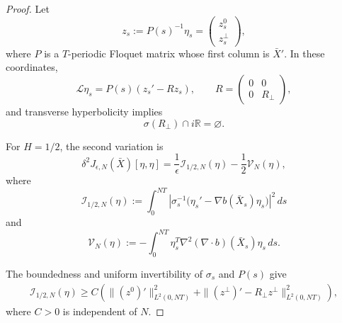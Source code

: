 \documentclass[preprint,12pt]{elsarticle}
\theoremstyle{definition}
\theoremstyle{plain}
\begin{document}
\begin{proof}
Let
\begin{equation*}
    z_s
    :=
    P(s)^{-1}\eta_s
    =
    \begin{pmatrix}
        z_s^0\\
        z_s^\perp
    \end{pmatrix},
\end{equation*}
where $P$ is a $T$-periodic Floquet matrix whose first column is
$\bar X'$. In these coordinates,
\begin{equation*}
    \mathcal L\eta_s
    =
    P(s)(z_s'-Rz_s),
    \qquad
    R=
    \begin{pmatrix}
        0&0\\
        0&R_\perp
    \end{pmatrix},
\end{equation*}
and transverse hyperbolicity implies
\begin{equation*}
    \sigma(R_\perp)\cap i\mathbb R=\varnothing.
\end{equation*}

For $H=1/2$, the second variation is
\begin{equation}
\label{eq:second-variation-H-half}
    \delta^2J_{\epsilon,N}(\bar X)[\eta,\eta]
    =
    \frac1\epsilon\mathcal I_{1/2,N}(\eta)
    -
    \frac12\mathcal V_N(\eta),
\end{equation}
where
\begin{equation}
\label{eq:kinetic-H-half}
    \mathcal I_{1/2,N}(\eta)
    :=
    \int_0^{NT}
    \left|
        \sigma_s^{-1}
        \bigl(
            \eta_s'-\nabla b(\bar X_s)\eta_s
        \bigr)
    \right|^2\,ds
\end{equation}
and
\begin{equation}
\label{eq:potential-H-half}
    \mathcal V_N(\eta)
    :=
    -
    \int_0^{NT}
    \eta_s^T
    \nabla^2(\nabla\!\cdot b)(\bar X_s)
    \eta_s\,ds.
\end{equation}

The boundedness and uniform invertibility of $\sigma_s$ and $P(s)$
give
\begin{equation}
\label{eq:kinetic-lower-bound-H-half}
\begin{aligned}
    \mathcal I_{1/2,N}(\eta)
    \geq
    C
    \left(
        \|(z^0)'\|_{L^2(0,NT)}^2
        +
        \|(z^\perp)'-R_\perp z^\perp\|_{L^2(0,NT)}^2
    \right),
\end{aligned}
\end{equation}
where $C>0$ is independent of $N$.


\end{proof}
\end{document}
